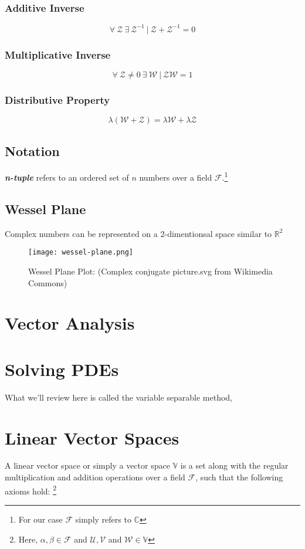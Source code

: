 \subsubsection{Additive Inverse}
$$\forall \ \mathcal{Z} \ \exists \ \mathcal{Z}^{-1} \ | \ \mathcal{Z} + \mathcal{Z}^{-1} = 0$$
\subsubsection{Multiplicative Inverse}
$$\forall \  \mathcal{Z} \neq 0 \ \exists \ \mathcal{W} \ | \ \mathcal{Z}\mathcal{W} = 1$$
\subsubsection{Distributive Property}
$$\lambda(\mathcal{W} + \mathcal{Z}) = \lambda\mathcal{W} + \lambda\mathcal{Z}$$
\subsection{Notation}
\textit{\textbf{n-tuple}} refers to an ordered set of $n$ numbers over a field $\mathcal{F}$.\footnote{For our case $\mathcal{F}$ simply refers to $\mathbb{C}$}
\subsection{Wessel Plane}
Complex numbers can be represented on a 2-dimentionsal space similar to $\mathbb{R}^{2}$
\begin{figure}[h]
	\centering
	\texttt{[image: wessel-plane.png]}
	\caption{Wessel Plane Plot: (Complex conjugate picture.svg from Wikimedia Commons)}
\end{figure}
\section{Vector Analysis}
\section{Solving PDEs}
What we'll review here is called the variable separable method, 
\section{Linear Vector Spaces} 
A linear vector space or simply a vector space $\mathbb{V}$ is a set along with the regular multiplication and addition operations over a field $\mathcal{F}$, such that the following axioms hold: \footnote{Here, $\alpha , \beta \in \mathcal{F}$ and $\mathcal{U}, \mathcal{V} $ and $\mathcal{W} \in \mathbb{V}$} \\

